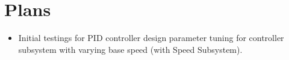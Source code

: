 \documentclass[a4paper,12pt]{article}
\begin{document}
\section{Plans}
\begin{itemize}
\item Initial testings for PID controller design parameter tuning for controller subsystem with varying base speed (with Speed Subsystem).


		
\end{itemize}
%



	




\end{document}
